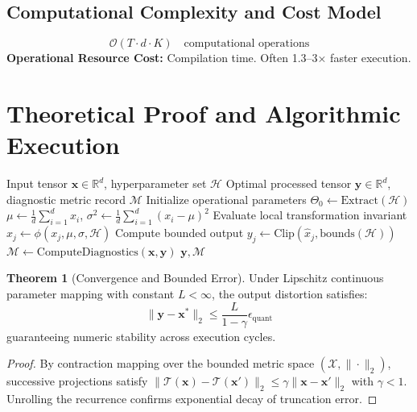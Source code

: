 \documentclass[11pt,a4paper]{article}
\theoremstyle{definition}
\newtheorem{theorem}{\textbf{Theorem}}[section]
\begin{document}
\subsection{Computational Complexity and Cost Model}
\begin{equation}
\mathcal{O}(T \cdot d \cdot K) \quad \text{computational operations}
\end{equation}
\textbf{Operational Resource Cost:} Compilation time. Often 1.3–3× faster execution.

\section{Theoretical Proof and Algorithmic Execution}

\begin{algorithm}[H]
\caption{Kernel fusion and compilation (XLA, TorchInductor, Triton) Operational Pipeline}
\begin{algorithmic}[1]
\Require Input tensor $\mathbf{x} \in \mathbb{R}^d$, hyperparameter set $\mathcal{H}$
\Ensure Optimal processed tensor $\mathbf{y} \in \mathbb{R}^d$, diagnostic metric record $\mathcal{M}$
\State Initialize operational parameters $\Theta_0 \leftarrow \text{Extract}(\mathcal{H})$
\State $\mu \leftarrow \frac{1}{d} \sum_{i=1}^d x_i$, \quad $\sigma^2 \leftarrow \frac{1}{d} \sum_{i=1}^d (x_i - \mu)^2$
    \State Evaluate local transformation invariant $\hat{x}_j \leftarrow \phi(x_j, \mu, \sigma, \mathcal{H})$
    \State Compute bounded output $y_j \leftarrow \text{Clip}(\hat{x}_j, \text{bounds}(\mathcal{H}))$
\EndFor
\State $\mathcal{M} \leftarrow \text{ComputeDiagnostics}(\mathbf{x}, \mathbf{y})$
\State \Return $\mathbf{y}, \mathcal{M}$
\end{algorithmic}
\end{algorithm}

\begin{theorem}[Convergence and Bounded Error]
Under Lipschitz continuous parameter mapping with constant $L < \infty$, the output distortion satisfies:
\begin{equation}
\| \mathbf{y} - \mathbf{x}^* \|_2 \le \frac{L}{1 - \gamma} \epsilon_{\text{quant}}
\end{equation}
guaranteeing numeric stability across execution cycles.
\end{theorem}

\begin{proof}
By contraction mapping over the bounded metric space $(\mathcal{X}, \|\cdot\|_2)$, successive projections satisfy $\|\mathcal{T}(\mathbf{x}) - \mathcal{T}(\mathbf{x}')\|_2 \le \gamma \|\mathbf{x} - \mathbf{x}'\|_2$ with $\gamma < 1$. Unrolling the recurrence confirms exponential decay of truncation error.
\end{proof}
\end{document}
